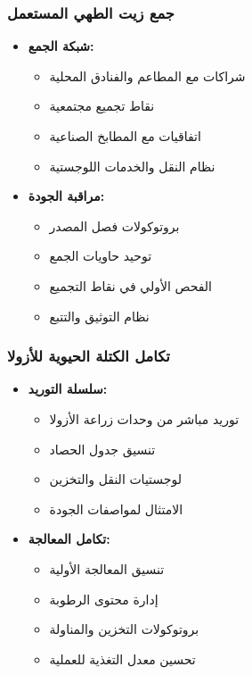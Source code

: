 \subsubsection{جمع زيت الطهي المستعمل}
\begin{itemize}
    \item \textbf{شبكة الجمع:}
    \begin{itemize}
        \item شراكات مع المطاعم والفنادق المحلية
        \item نقاط تجميع مجتمعية
        \item اتفاقيات مع المطابخ الصناعية
        \item نظام النقل والخدمات اللوجستية
    \end{itemize}
    
    \item \textbf{مراقبة الجودة:}
    \begin{itemize}
        \item بروتوكولات فصل المصدر
        \item توحيد حاويات الجمع
        \item الفحص الأولي في نقاط التجميع
        \item نظام التوثيق والتتبع
    \end{itemize}
\end{itemize}

\subsubsection{تكامل الكتلة الحيوية للأزولا}
\begin{itemize}
    \item \textbf{سلسلة التوريد:}
    \begin{itemize}
        \item توريد مباشر من وحدات زراعة الأزولا
        \item تنسيق جدول الحصاد
        \item لوجستيات النقل والتخزين
        \item الامتثال لمواصفات الجودة
    \end{itemize}
    
    \item \textbf{تكامل المعالجة:}
    \begin{itemize}
        \item تنسيق المعالجة الأولية
        \item إدارة محتوى الرطوبة
        \item بروتوكولات التخزين والمناولة
        \item تحسين معدل التغذية للعملية
    \end{itemize}
\end{itemize}

